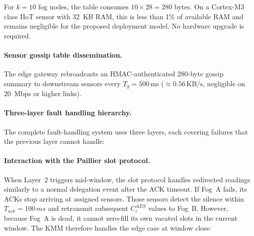\documentclass[conference]{IEEEtran}
\begin{document}
    For $k=10$ fog nodes, the table consumes $10\times 28=280$ bytes. On a Cortex-M3 class IIoT sensor with 32~KB RAM, this is less than 1\% of available RAM and remains negligible for the proposed deployment model. No hardware upgrade is required.

    \paragraph{Sensor gossip table dissemination.}
    The edge gateway rebroadcasts an HMAC-authenticated 280-byte gossip summary to downstream sensors every $T_g=500\,\text{ms}$ ($\approx0.56\,\text{KB/s}$, negligible on 20~Mbps or higher links).

    \paragraph{Three-layer fault handling hierarchy.}
    The complete fault-handling system uses three layers, each covering failures that the previous layer cannot handle:

    \begin{table}[htbp]
    \caption{Three-Layer Fault Handling Hierarchy}
    \label{table:fault-hierarchy}
    \centering
    \end{table}

    \paragraph{Interaction with the Paillier slot protocol.}
    When Layer~2 triggers mid-window, the slot protocol handles redirected readings similarly to a normal delegation event after the ACK timeout. If Fog~A fails, its ACKs stop arriving at assigned sensors. Those sensors detect the silence within $T_{ack}=100\,ms$ and retransmit subsequent $C_i^{AES}$ values to Fog~B. However, because Fog~A is dead, it cannot zero-fill its own vacated slots in the current window. The KMM therefore handles the edge case at window close:
\end{document}
